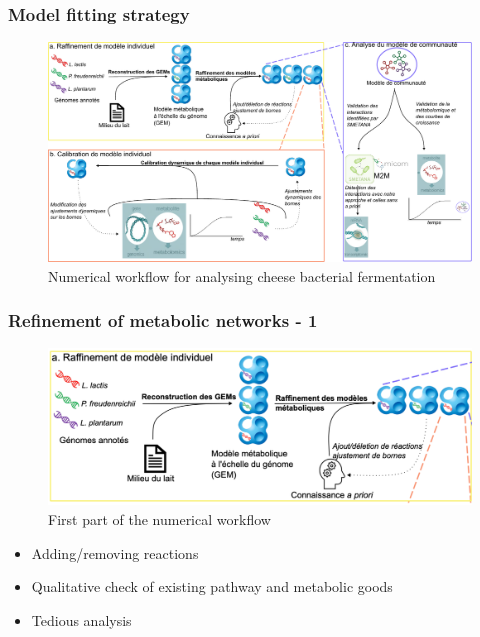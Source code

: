 \documentclass[8pt]{beamer}
\begin{document}
\begin{frame}
\frametitle{Model fitting strategy}

\begin{adjustwidth}{-1cm}{}
\begin{figure}
\includegraphics[width=1.2\textwidth]{figures/global.pdf}
\vspace{-0.7cm}\caption{Numerical workflow for analysing cheese bacterial fermentation}
\end{figure}
\end{adjustwidth}
\end{frame}

\begin{frame}
\frametitle{Refinement of metabolic networks - 1}

\begin{figure}
\includegraphics[width=\textwidth]{figures/global-a}
\caption{First part of the numerical workflow}
\end{figure}

\begin{block}{}
\begin{itemize}
\item Adding/removing reactions
\item Qualitative check of existing pathway and metabolic goods
\item Tedious analysis
\end{itemize}
\end{block}

\end{frame}
\end{document}
